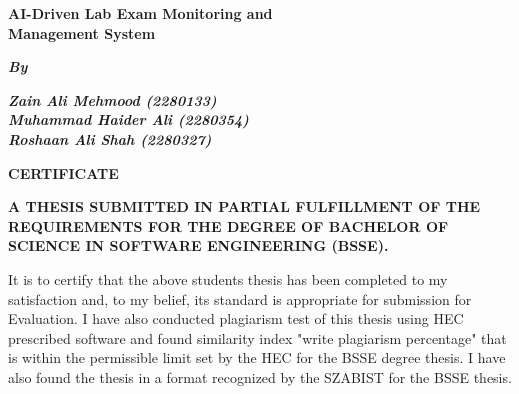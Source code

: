 \singlespacing
\newpage
\thispagestyle{empty}

\begin{center}
\vspace*{0.8cm}

{\bfseries\fontsize{20}{24}\selectfont 
AI-Driven Lab Exam Monitoring and\\
Management System\par}

\vspace{0.8cm}

{\bfseries\itshape\fontsize{16}{18}\selectfont By\par}

\vspace{0.5cm}

{\bfseries\itshape\fontsize{14}{16}\selectfont
Zain Ali Mehmood (2280133)\\
Muhammad Haider Ali (2280354)\\
Roshaan Ali Shah (2280327)\par}

\vspace{0.8cm}

{\bfseries\fontsize{22}{26}\selectfont CERTIFICATE\par}

\end{center}

\vspace{0.6cm}

\begin{center}
{\bfseries\fontsize{11}{14}\selectfont
A THESIS SUBMITTED IN PARTIAL FULFILLMENT OF THE REQUIREMENTS FOR THE DEGREE OF BACHELOR OF SCIENCE IN SOFTWARE ENGINEERING (BSSE).\par}
\end{center}

\vspace{0.6cm}

{\fontsize{12.5}{14}\selectfont
It is to certify that the above students thesis has been completed to my satisfaction and, to my belief, its standard is appropriate for submission for Evaluation. I have also conducted plagiarism test of this thesis using HEC prescribed software and found similarity index "write plagiarism percentage" that is within the permissible limit set by the HEC for the BSSE degree thesis. I have also found the thesis in a format recognized by the SZABIST for the BSSE thesis.
}

\vspace{1.5cm}

